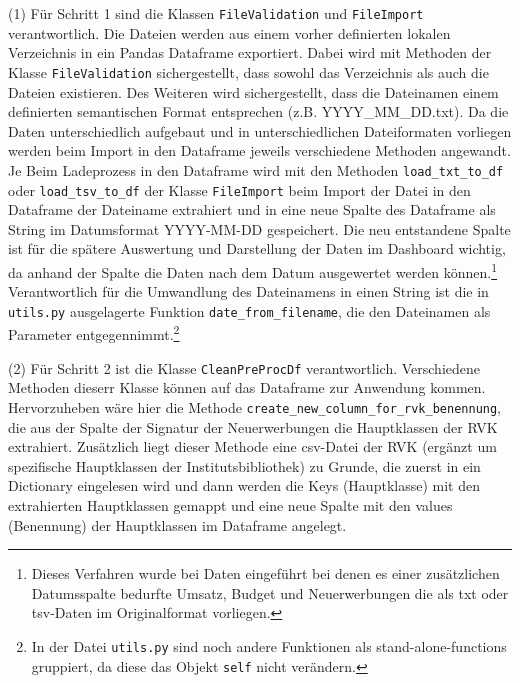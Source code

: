     
    (1) Für Schritt 1 sind die Klassen \texttt{FileValidation} und \texttt{FileImport} verantwortlich.
    Die Dateien werden aus einem vorher definierten lokalen Verzeichnis in ein Pandas Dataframe exportiert. Dabei wird mit Methoden
    der Klasse \texttt{FileValidation} sichergestellt, dass sowohl das Verzeichnis als auch die Dateien existieren. Des Weiteren wird sichergestellt,
    dass die Dateinamen einem definierten semantischen Format entsprechen (z.B. YYYY\_MM\_DD.txt). 
    Da die Daten unterschiedlich aufgebaut und in unterschiedlichen Dateiformaten vorliegen werden beim Import in den Dataframe jeweils verschiedene Methoden angewandt. Je
    Beim Ladeprozess in den Dataframe wird mit den Methoden \texttt{load\_txt\_to\_df} oder \texttt{load\_tsv\_to\_df} der Klasse \texttt{FileImport} beim Import der Datei in den Dataframe der Dateiname
    extrahiert und in eine neue Spalte des Dataframe als String im Datumsformat YYYY-MM-DD gespeichert. Die neu entstandene Spalte ist für die spätere Auswertung und
    Darstellung der Daten im Dashboard wichtig, da anhand der Spalte die Daten nach dem Datum ausgewertet werden können.\footnote{Dieses Verfahren wurde bei Daten eingeführt
    bei denen es einer zusätzlichen Datumsspalte bedurfte Umsatz,
    Budget und Neuerwerbungen die als txt oder tsv-Daten im Originalformat vorliegen.} Verantwortlich für die Umwandlung des Dateinamens in einen String ist die in \texttt{utils.py}
    ausgelagerte Funktion \texttt{date\_from\_filename}, die den Dateinamen als Parameter entgegennimmt.\footnote{In der Datei \texttt{utils.py} sind noch andere Funktionen 
    als stand-alone-functions gruppiert, da diese das Objekt \texttt{self} nicht verändern.} 
    
    (2) Für Schritt 2 ist die Klasse \texttt{CleanPreProcDf} verantwortlich. Verschiedene Methoden dieserr Klasse können auf das Dataframe zur Anwendung kommen. 
    Hervorzuheben wäre hier die Methode \texttt{create\_new\_column\_for\_rvk\_benennung}, die aus der Spalte der Signatur 
    der Neuerwerbungen die Hauptklassen der RVK extrahiert. Zusätzlich liegt dieser Methode eine csv-Datei
    der \acrshort{RVK} (ergänzt um spezifische Hauptklassen der Institutsbibliothek) zu Grunde, die zuerst in ein Dictionary eingelesen wird 
    und dann werden die Keys (Hauptklasse) mit den extrahierten Hauptklassen gemappt und eine neue Spalte mit den values (Benennung) der Hauptklassen im Dataframe angelegt.    
    
